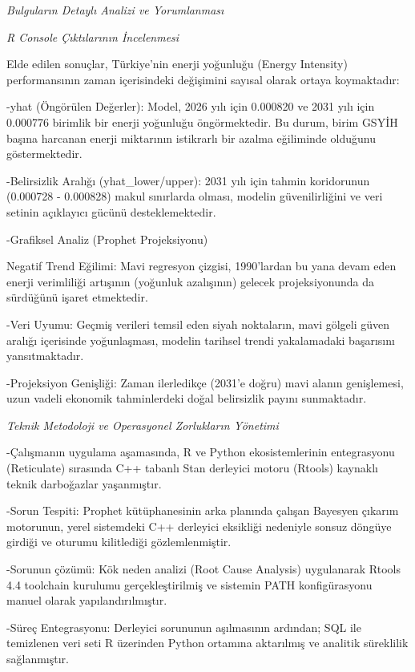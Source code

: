 \documentclass[
]{article}
\begin{document}
\emph{Bulguların Detaylı Analizi ve Yorumlanması}

\emph{R Console Çıktılarının İncelenmesi}

Elde edilen sonuçlar, Türkiye'nin enerji yoğunluğu (Energy Intensity)
performansının zaman içerisindeki değişimini sayısal olarak ortaya
koymaktadır:

-yhat (Öngörülen Değerler): Model, 2026 yılı için 0.000820 ve 2031 yılı
için 0.000776 birimlik bir enerji yoğunluğu öngörmektedir. Bu durum,
birim GSYİH başına harcanan enerji miktarının istikrarlı bir azalma
eğiliminde olduğunu göstermektedir.

-Belirsizlik Aralığı (yhat\_lower/upper): 2031 yılı için tahmin
koridorunun (0.000728 - 0.000828) makul sınırlarda olması, modelin
güvenilirliğini ve veri setinin açıklayıcı gücünü desteklemektedir.

-Grafiksel Analiz (Prophet Projeksiyonu)

Negatif Trend Eğilimi: Mavi regresyon çizgisi, 1990'lardan bu yana devam
eden enerji verimliliği artışının (yoğunluk azalışının) gelecek
projeksiyonunda da sürdüğünü işaret etmektedir.

-Veri Uyumu: Geçmiş verileri temsil eden siyah noktaların, mavi gölgeli
güven aralığı içerisinde yoğunlaşması, modelin tarihsel trendi
yakalamadaki başarısını yansıtmaktadır.

-Projeksiyon Genişliği: Zaman ilerledikçe (2031'e doğru) mavi alanın
genişlemesi, uzun vadeli ekonomik tahminlerdeki doğal belirsizlik payını
sunmaktadır.

\emph{Teknik Metodoloji ve Operasyonel Zorlukların Yönetimi}

-Çalışmanın uygulama aşamasında, R ve Python ekosistemlerinin
entegrasyonu (Reticulate) sırasında C++ tabanlı Stan derleyici motoru
(Rtools) kaynaklı teknik darboğazlar yaşanmıştır.

-Sorun Tespiti: Prophet kütüphanesinin arka planında çalışan Bayesyen
çıkarım motorunun, yerel sistemdeki C++ derleyici eksikliği nedeniyle
sonsuz döngüye girdiği ve oturumu kilitlediği gözlemlenmiştir.

-Sorunun çözümü: Kök neden analizi (Root Cause Analysis) uygulanarak
Rtools 4.4 toolchain kurulumu gerçekleştirilmiş ve sistemin PATH
konfigürasyonu manuel olarak yapılandırılmıştır.

-Süreç Entegrasyonu: Derleyici sorununun aşılmasının ardından; SQL ile
temizlenen veri seti R üzerinden Python ortamına aktarılmış ve analitik
süreklilik sağlanmıştır.
\end{document}
